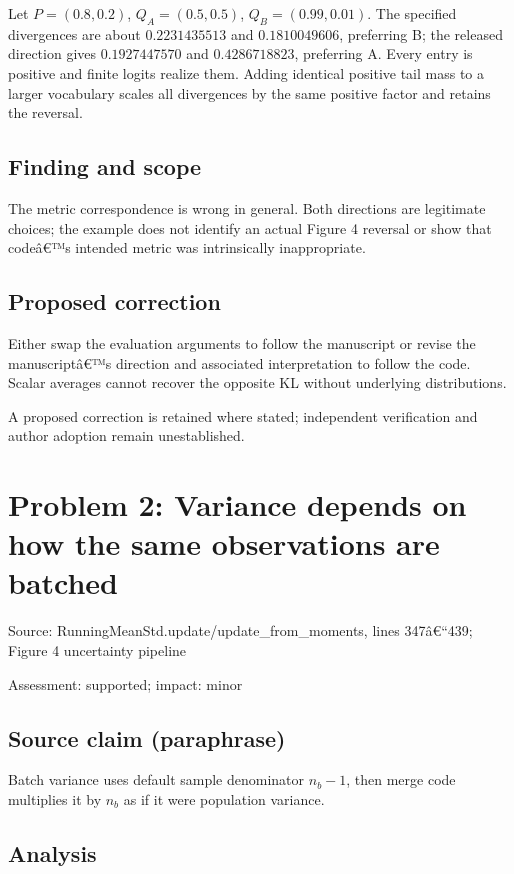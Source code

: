 \documentclass[11pt]{article}
\begin{document}
Let \(P=(0.8,0.2)\), \(Q_A=(0.5,0.5)\), \(Q_B=(0.99,0.01)\). The specified divergences are about \(0.2231435513\) and \(0.1810049606\), preferring B; the released direction gives \(0.1927447570\) and \(0.4286718823\), preferring A. Every entry is positive and finite logits realize them. Adding identical positive tail mass to a larger vocabulary scales all divergences by the same positive factor and retains the reversal.

\subsection*{Finding and scope}

The metric correspondence is wrong in general. Both directions are legitimate choices; the example does not identify an actual Figure 4 reversal or show that codeâ€™s intended metric was intrinsically inappropriate.

\subsection*{Proposed correction}

Either swap the evaluation arguments to follow the manuscript or revise the manuscriptâ€™s direction and associated interpretation to follow the code. Scalar averages cannot recover the opposite KL without underlying distributions.

A proposed correction is retained where stated; independent verification and author adoption remain unestablished.

\section*{Problem 2: Variance depends on how the same observations are batched}

Source: RunningMeanStd.update/update\_from\_moments, lines 347â€“439; Figure 4 uncertainty pipeline

Assessment: supported; impact: minor

\subsection*{Source claim (paraphrase)}

Batch variance uses default sample denominator \(n_b-1\), then merge code multiplies it by \(n_b\) as if it were population variance.

\subsection*{Analysis}
\end{document}
